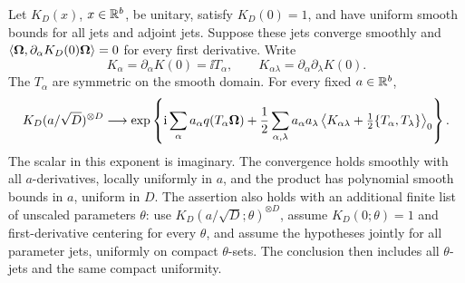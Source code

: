 \begin{lemma}\label{lem:unitary-clt}
Let $K_D(x)$, $x\in\mathbb R^b$, be unitary, satisfy $K_D(0)=1$, and
have uniform smooth bounds for all jets and adjoint jets.  Suppose
these jets converge smoothly and
$\langle \boldsymbol\Omega,\partial_\alpha K_D(0)\boldsymbol\Omega\rangle=0$ for every first
derivative.  Write
\[
 K_\alpha=\partial_\alpha K(0)=\ii T_\alpha,
 \qquad K_{\alpha\lambda}=\partial_\alpha\partial_\lambda K(0).
\]
The $T_\alpha$ are symmetric on the smooth domain.  For every
fixed $a\in\mathbb R^b$,
\begin{equation}\label{eq:unitary-product-limit}
 K_D(a/\sqrt D)^{\otimes D}\longrightarrow
 \exp\left\{\mathrm i\sum_\alpha a_\alpha q(T_\alpha\boldsymbol\Omega)
 +\frac12\sum_{\alpha,\lambda}a_\alpha a_\lambda
 \left\langle K_{\alpha\lambda}
           +\tfrac12\{T_\alpha,T_\lambda\}\right\rangle_0
 \right\}.
\end{equation}
The scalar in this exponent is imaginary.  The convergence holds
smoothly with all $a$-derivatives, locally uniformly in $a$, and
the product has polynomial smooth bounds in $a$, uniform in $D$.
The assertion also holds with an additional finite list of
unscaled parameters $\theta$: use
$K_D(a/\sqrt D;\theta)^{\otimes D}$, assume
$K_D(0;\theta)=1$ and first-derivative centering for every
$\theta$, and assume the hypotheses jointly for all parameter
jets, uniformly on compact $\theta$-sets.  The conclusion then
includes all $\theta$-jets and the same compact uniformity.
\end{lemma}

